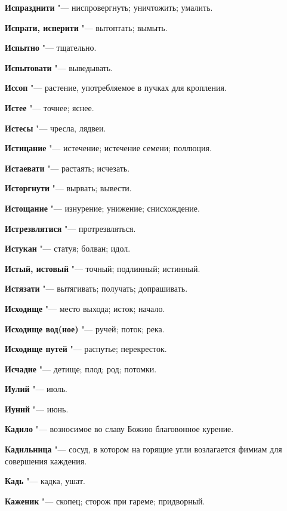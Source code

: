 \begin{mymulticols}
\noindent\textbf{Испразднити} "--- ниспровергнуть; уничтожить; умалить. 

\noindent\textbf{Испрати, исперити} "--- вытоптать; вымыть. 

\noindent\textbf{Испытно} "--- тщательно. 

\noindent\textbf{Испытовати} "--- выведывать. 

\noindent\textbf{Иссоп} "--- растение, употребляемое в пучках для кропления. 

\noindent\textbf{Истее} "--- точнее; яснее. 

\noindent\textbf{Истесы} "--- чресла, лядвеи. 

\noindent\textbf{Истицание} "--- истечение; истечение семени; поллюция. 

\noindent\textbf{Истаевати} "--- растаять; исчезать. 

\noindent\textbf{Исторгнути} "--- вырвать; вывести. 

\noindent\textbf{Истощание} "--- изнурение; унижение; снисхождение. 

\noindent\textbf{Истрезвлятися} "--- протрезвляться. 

\noindent\textbf{Истукан} "--- статуя; болван; идол. 

\noindent\textbf{Истый, истовый} "--- точный; подлинный; истинный. 

\noindent\textbf{Истязати} "--- вытягивать; получать; допрашивать. 

\noindent\textbf{Исходище} "--- место выхода; исток; начало. 

\noindent\textbf{Исходище вод(ное)} "--- ручей; поток; река. 

\noindent\textbf{Исходище путей} "--- распутье; перекресток. 

\noindent\textbf{Исчадие} "--- детище; плод; род; потомки. 

\noindent\textbf{Иулий} "--- июль. 

\noindent\textbf{Иуний} "--- июнь. 

\bukvaending


\noindent\textbf{Кадило} "--- возносимое во славу Божию благовонное курение. 

\noindent\textbf{Кадильница} "--- сосуд, в котором на горящие угли возлагается фимиам для совершения каждения. 

\noindent\textbf{Кадь} "--- кадка, ушат. 

\noindent\textbf{Каженик} "--- скопец; сторож при гареме; придворный. 


\end{mymulticols}
